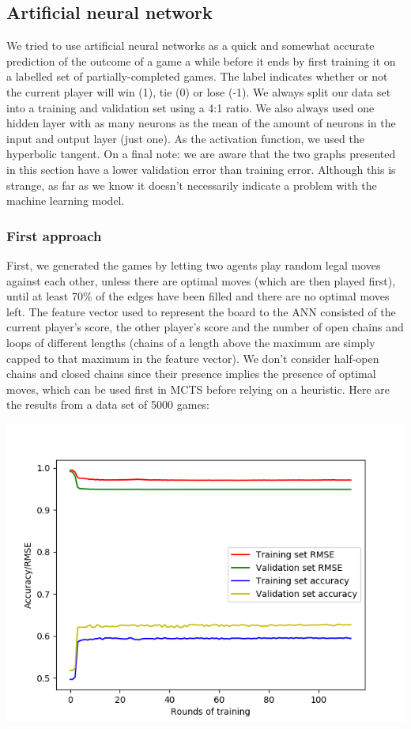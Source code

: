 \subsection{Artificial neural network\label{s:ann}}

We tried to use artificial neural networks as a quick and somewhat accurate prediction of the outcome of a game a while before it ends by first training it on a labelled set of partially-completed games. The label indicates whether or not the current player will win (1), tie (0) or lose (-1). We always split our data set into a training and validation set using a 4:1 ratio. We also always used one hidden layer with as many neurons as the mean of the amount of neurons in the input and output layer (just one). As the activation function, we used the hyperbolic tangent. On a final note: we are aware that the two graphs presented in this section have a lower validation error than training error. Although this is strange, as far as we know it doesn't necessarily indicate a problem with the machine learning model.

\subsubsection{First approach}

First, we generated the games by letting two agents play random legal moves against each other, unless there are optimal moves (which are then played first), until at least 70\% of the edges have been filled and there are no optimal moves left. The feature vector used to represent the board to the ANN consisted of the current player's score, the other player's score and the number of open chains and loops of different lengths (chains of a length above the maximum are simply capped to that maximum in the feature vector). We don't consider half-open chains and closed chains since their presence implies the presence of optimal moves, which can be used first in MCTS before relying on a heuristic. Here are the results from a data set of 5000 games:

\begin{center}
\includegraphics[scale=0.65]{images/ann_rmse+accuracy_(5000_games).png}
\end{center}

